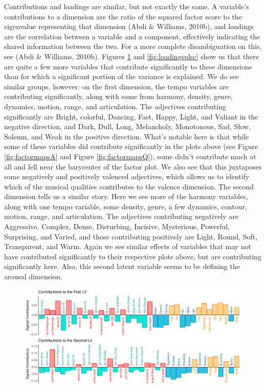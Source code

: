 \documentclass[
  english,
  man,floatsintext]{apa6}
\begin{document}
Contributions and loadings are similar, but not exactly the same. A variable's contributions to a dimension are the ratio of the squared factor score to the eigenvalue representing that dimension (Abdi \& Williams, 2010b), and loadings are the correlation between a variable and a component, effectively indicating the shared information between the two. For a more complete disambiguation on this, see (Abdi \& Williams, 2010b). Figures \ref{fig:contsplsc} and \ref{fig:loadingsplsc} show us that there are quite a few more variables that contribute significantly to these dimensions than for which a significant portion of the variance is explained. We do see similar groups, however: on the first dimension, the tempo variables are contributing significantly, along with some from harmony, density, genre, dynamics, motion, range, and articulation. The adjectives contributing significantly are Bright, colorful, Dancing, Fast, Happy, Light, and Valiant in the negative direction, and Dark, Dull, Long, Melancholy, Monotonous, Sad, Slow, Solemn, and Weak in the positive direction. What's notable here is that while some of these variables did contribute significantly in the plots above (see Figure \ref{fig:factormapsA} and Figure \ref{fig:factormapsQ}), some didn't contribute much at all and fell near the barycenter of the factor plot. We also see that this juxtaposes some negatively and positively valenced adjectives, which allows us to identify which of the musical qualities contributes to the valence dimension.
The second dimension tells us a similar story. Here we see more of the harmony variables, along with one tempo variable, some density, genre, a few dynamics, contour, motion, range, and articulation. The adjectives contributing negatively are Aggressive, Complex, Dense, Disturbing, Incisive, Mysterious, Powerful, Surprising, and Varied, and those contributing positively are Light, Round, Soft, Transparent, and Warm. Again we see similar effects of variables that may not have contributed significantly to their respective plots above, but are contributing significantly here. Also, this second latent variable seems to be defining the arousal dimension.\\

\begin{figure}

{\centering \includegraphics{Music-Descriptor-Space_files/figure-latex/contsplsc-1} 

}

\caption{ }\label{fig:contsplsc}
\end{figure}
\end{document}
